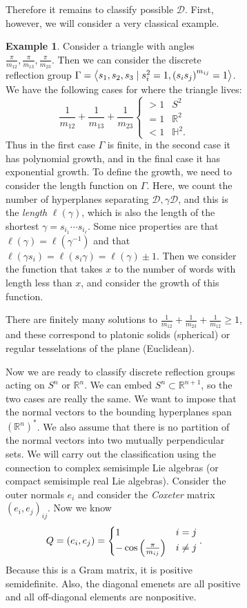 \documentclass[leqno, openany]{memoir}
\theoremstyle{definition}
\newtheorem{exm}[thm]{Example}
\theoremstyle{remark}
\theoremstyle{plain}
\theoremstyle{definition}
\theoremstyle{remark}
\newcommand{\R}{\mathbb{R}}
\renewcommand{\H}{\mathbb{H}}
\newcommand{\mc}[1]{\mathcal{#1}}
\begin{document}
\begin{figure}[H]
\begin{figure}[H]
Therefore it remains to classify possible $\mc{D}$. First, however, we will
consider a very classical example.

\begin{exm} Consider a triangle with angles $\frac{\pi}{m_{12}},
    \frac{\pi}{m_{13}}, \frac{\pi}{m_{23}}$.  Then we can consider the discrete
    reflection group $\Gamma = \ev{s_1, s_2, s_3 \mid s_i^2 = 1, {(s_i
    s_j)}^{m_{ij}} = 1}$. We have the following cases for where the triangle
    lives: \[ \frac{1}{m_{12}} + \frac{1}{m_{13}} + \frac{1}{m_{23}}
        \begin{cases} > 1 & S^2 \\ = 1 & \R^2 \\ < 1 & \H^2.  \end{cases} \]
        Thus in the first case $\Gamma$ is finite, in the second case it has
        polynomial growth, and in the final case it has exponential growth. To
        define the growth, we need to consider the length function on $\Gamma$.
        Here, we count the number of hyperplanes separating $\mc{D}, \gamma
        \mc{D}$, and this is the \textit{length} $\ell(\gamma)$, which is also
        the length of the shortest $\gamma = s_{i_1} \cdots s_{i_{\ell}}$. Some
        nice properties are that $\ell(\gamma) = \ell(\gamma^{-1})$ and that
        $\ell(\gamma s_i) = \ell(s_i \gamma) = \ell(\gamma) \pm 1$. Then we
        consider the function that takes $x$ to the number of words with length
        less than $x$, and consider the growth of this function.

    There are finitely many solutions to $\frac{1}{m_{12}} + \frac{1}{m_{23}} +
\frac{1}{m_{12}} \geq 1$, and these correspond to platonic solids (spherical)
or regular tesselations of the plane (Euclidean).  \end{exm}

Now we are ready to classify discrete reflection groups acting on $S^n$ or
$\R^n$. We can embed $S^n \subset \R^{n+1}$, so the two cases are really the
same. We want to impose that the normal vectors to the bounding hyperplanes
span ${(\R^n)}^*$. We also assume that there is no partition of the normal
vectors into two mutually perpendicular sets. We will carry out the
classification using the connection to complex semisimple Lie algebras (or
compact semisimple real Lie algebras). Consider the outer normals $e_i$ and
consider the \textit{Coxeter} matrix ${(e_i, e_j)}_{ij}$. Now we know \[ Q =
    (e_i, e_j) = \begin{cases} 1 & i = j \\ - \cos \qty(\frac{\pi}{m_{ij}}) & i
    \neq j \end{cases}. \] Because this is a Gram matrix, it is positive
    semidefinite. Also, the diagonal emenets are all positive and all
    off-diagonal elements are nonpositive. 


\end{figure}
\end{figure}
\end{document}
